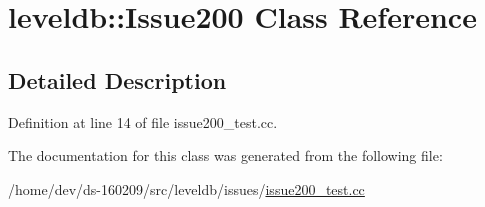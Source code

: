 \hypertarget{classleveldb_1_1_issue200}{}\section{leveldb\+:\+:Issue200 Class Reference}
\label{classleveldb_1_1_issue200}


\subsection{Detailed Description}


Definition at line 14 of file issue200\+\_\+test.\+cc.



The documentation for this class was generated from the following file\+:\begin{DoxyCompactItemize}
\item 
/home/dev/ds-\/160209/src/leveldb/issues/\hyperlink{issue200__test_8cc}{issue200\+\_\+test.\+cc}\end{DoxyCompactItemize}
